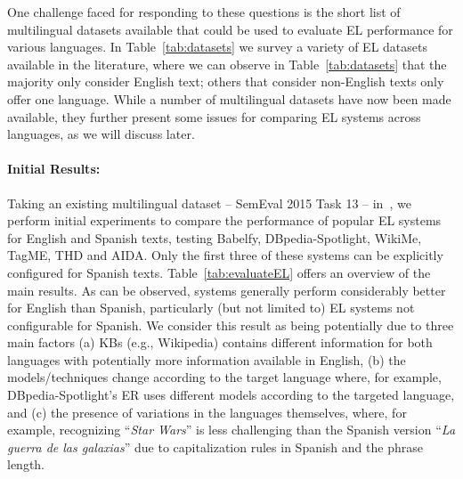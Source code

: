 \documentclass[sigconf]{acmart}
\begin{document}
One challenge faced for responding to these questions is the short list of multilingual datasets available that could be used to evaluate EL performance for various languages. In Table~\ref{tab:datasets} we survey a variety of EL datasets available in the literature, where we can observe in Table~\ref{tab:datasets} that the majority only consider English text; others that consider non-English texts only offer one language. While a number of multilingual datasets have now been made available, they further present some issues for comparing EL systems across languages, as we will discuss later.


\paragraph{Initial Results:} Taking an existing multilingual dataset -- SemEval 2015 Task 13 -- in~\cite{Rosales-MendezP17}, we perform initial experiments to compare the performance of popular EL systems for English and Spanish texts, testing Babelfy, DBpedia-Spotlight, WikiMe, TagME, THD and AIDA. Only the first three of these systems can be explicitly configured for Spanish texts. Table~\ref{tab:evaluateEL} offers an overview of the main results. As can be observed, systems generally perform considerably better for English than Spanish, particularly (but not limited to) EL systems not configurable for Spanish. We consider this result as being potentially due to three main factors (a) KBs (e.g., Wikipedia) contains different information for both languages with potentially more information available in English, (b) the models/techniques change according to the target language where, for example, DBpedia-Spotlight's ER uses different models according to the targeted language, and (c) the presence of variations in the languages themselves, where, for example, recognizing ``\textit{Star Wars}'' is less challenging than the Spanish version ``\textit{La guerra de las galaxias}'' due to capitalization rules in Spanish and the phrase length.

\end{document}
